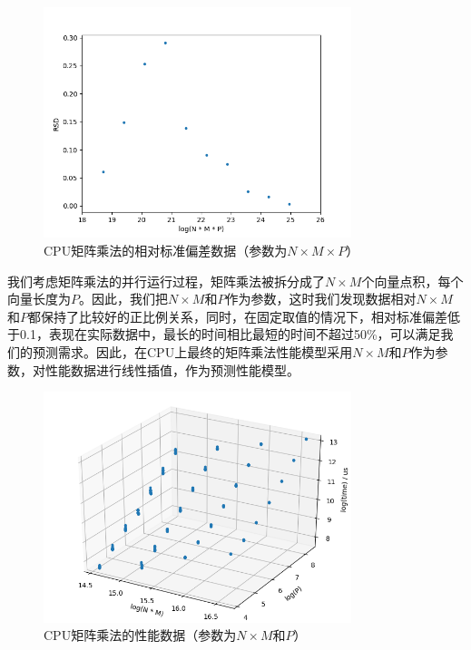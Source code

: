     \begin{figure}[!htbp]
        \centering
        \includegraphics[width=0.8\textwidth]{figures/matmul_cpu_nmp_rsd.png}
        \caption{CPU矩阵乘法的相对标准偏差数据（参数为$ N \times M \times P $）}
        \label{fig:matmul_cpu_nmp_rsd}
    \end{figure}
    
    我们考虑矩阵乘法的并行运行过程，矩阵乘法被拆分成了$ N \times M $个向量点积，每个向量长度为$ P $。因此，我们把$ N \times M $和$ P $作为参数，这时我们发现数据相对$ N \times M $和$ P $都保持了比较好的正比例关系，同时，在固定取值的情况下，相对标准偏差低于0.1，表现在实际数据中，最长的时间相比最短的时间不超过50\%，可以满足我们的预测需求。因此，在CPU上最终的矩阵乘法性能模型采用$ N \times M $和$ P $作为参数，对性能数据进行线性插值，作为预测性能模型。
    
    \begin{figure}[!htbp]
        \centering
        \includegraphics[width=0.8\textwidth]{figures/matmul_cpu_nm_p.png}
        \caption{CPU矩阵乘法的性能数据（参数为$N \times M $和$ P $）}
        \label{fig:matmul_cpu_nm_p}
    \end{figure}

